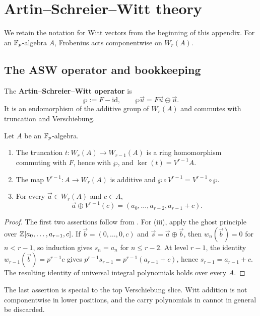 \section{Artin--Schreier--Witt theory}
\label{appendix:asw_development}

We retain the notation for Witt vectors from the beginning of this appendix.
For an $\mathbb{F}_p$-algebra $A$, Frobenius acts componentwise on $W_r(A)$.

\subsection{The ASW operator and bookkeeping}

\begin{definition}\label{definition:asw_operator}
The \textbf{Artin--Schreier--Witt operator} is
\[
\wp:=F-\mathrm{id},\qquad
\wp\vec u=F\vec u\ominus\vec u.
\]
It is an endomorphism of the additive group of $W_r(A)$ and commutes with
truncation and Verschiebung.
\end{definition}

\begin{lemma}\label{lemma:witt_bookkeeping}
Let $A$ be an $\mathbb{F}_p$-algebra.
\begin{enumerate}[label=(\roman*)]
    \item The truncation $t:W_r(A)\to W_{r-1}(A)$ is a ring homomorphism
    commuting with $F$, hence with $\wp$, and
    $\ker(t)=V^{r-1}A$.
    \item The map $V^{r-1}:A\to W_r(A)$ is additive and
    $\wp\circ V^{r-1}=V^{r-1}\circ\wp$.
    \item For every $\vec a\in W_r(A)$ and $c\in A$,
    \[
    \vec a\oplus V^{r-1}(c)
    =(a_0,\dots,a_{r-2},a_{r-1}+c).
    \]
\end{enumerate}
\end{lemma}

\begin{proof}
The first two assertions follow from
. For (iii), apply the ghost principle
over $\mathbb{Z}[a_0,\dots,a_{r-1},c]$. If
$\vec b=(0,\dots,0,c)$ and $\vec s=\vec a\oplus\vec b$, then
$w_n(\vec b)=0$ for $n<r-1$, so induction gives $s_n=a_n$ for
$n\leq r-2$. At level $r-1$, the identity
$w_{r-1}(\vec b)=p^{r-1}c$ gives
$p^{r-1}s_{r-1}=p^{r-1}(a_{r-1}+c)$, hence
$s_{r-1}=a_{r-1}+c$. The resulting identity of universal integral
polynomials holds over every $A$.
\end{proof}

The last assertion is special to the top Verschiebung slice. Witt addition is
not componentwise in lower positions, and the carry polynomials in
 cannot in general be discarded.


